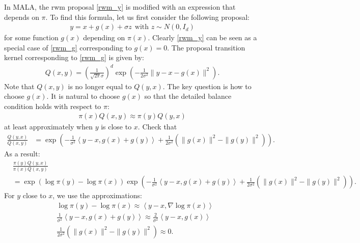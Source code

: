 \documentclass{scrartcl}
\begin{document}
In MALA, the rwm proposal \eqref{rwm_y} is modified with an expression
that depends on $\pi$. To find this formula, let us first consider the
following proposal: 
\begin{align}\label{rwm_g}
  y = x + g(x) + \sigma z ~~\text{with $z \sim N(0, I_d)$}
\end{align}
for some function $g(x)$ depending on $\pi(x)$. Clearly \eqref{rwm_y}
can be seen as a special case of \eqref{rwm_g} corresponding to $g(x)
= 0$. The proposal transition kernel corresponding to \eqref{rwm_g} is
given by: 
\begin{align*}
  Q(x, y) = \left(\frac{1}{\sqrt{2 \pi} \sigma} \right)^d
 \exp \left(-\frac{1}{2 \sigma^2} \|y - x - g(x)
  \|^2 \right).
\end{align*}
Note that $Q(x, y)$ is no longer equal to $Q(y, x)$. The key question
is how to choose $g(x)$. It is natural to choose $g(x)$ so that the
detailed balance condition holds with respect to $\pi$: 
\begin{align*}
  \pi(x) Q(x, y) \approx \pi(y) Q(y, x) 
\end{align*}
at least approximately when $y$ is close to $x$. Check that
\begin{align*}
  \frac{Q(y, x)}{Q(x, y)} &= \exp \left(-
                                              \frac{1}{\sigma^2}\left<y
                                              - 
                                              x, g(x) + g(y) \right> +
                                              \frac{1}{2 \sigma^2}  
  \left(\|g(x)\|^2 - \|g(y)\|^2 \right) \right). 
\end{align*}
As a result:
\begin{align*}
&  \frac{\pi(y)Q(y, x)}{\pi(x) Q(x, y)} \\ &= \exp
                                                           \left(\log
                                                           \pi(y) -
                                                           \log \pi(x)
                                                           \right) \exp \left(-
                                              \frac{1}{\sigma^2}\left<y
                                              - 
                                              x, g(x) + g(y) \right> +
                                              \frac{1}{2 \sigma^2}  
  \left(\|g(x)\|^2 - \|g(y)\|^2 \right) \right). 
\end{align*}
For $y$ close to $x$, we use the approximations: 
\begin{align*}
&  \log \pi(y) - \log \pi(x) \approx \left<y - x, \nabla \log \pi(x)
  \right> \\
&   \frac{1}{\sigma^2}\left<y
                                              - 
                                              x, g(x) + g(y) \right>
  \approx \frac{2}{\sigma^2} \left<y - x, g(x) \right> \\
& \frac{1}{2 \sigma^2} \left(\|g(x)\|^2 - \|g(y)\|^2 \right) \approx
  0. 
\end{align*}
\end{document}
